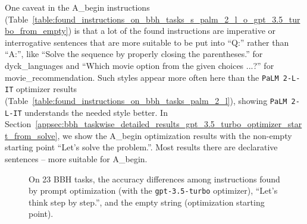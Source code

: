 One caveat in the A\_begin instructions (Table~\ref{table:found_instructions_on_bbh_tasks_s_palm_2_l_o_gpt_3.5_turbo_from_empty}) is that a lot of the found instructions are imperative or interrogative sentences that are more suitable to be put into ``Q:'' rather than ``A:'', like ``Solve the sequence by properly closing the parentheses.'' for dyck\_languages and ``Which movie option from the given choices ...?'' for movie\_recommendation.
Such styles appear more often here than the \texttt{PaLM 2-L-IT} optimizer results (Table~\ref{table:found_instructions_on_bbh_tasks_palm_2_l}), showing \texttt{PaLM 2-L-IT} understands the needed style better.
In Section~\ref{appsec:bbh_taskwise_detailed_results_gpt_3.5_turbo_optimizer_start_from_solve}, we show the A\_begin optimization results with the non-empty starting point ``Let's solve the problem.''.
Most results there are declarative sentences -- more suitable for A\_begin.

\begin{figure}[H]
\centering
{}

\caption{On 23 BBH tasks, the accuracy differences among instructions found by prompt optimization (with the \texttt{gpt-3.5-turbo} optimizer), ``Let's think step by step.'', and the empty string (optimization starting point).
}
\label{fig:accuracy_comparison_bar_charts_o_gpt_3.5_turbo}
\end{figure}


